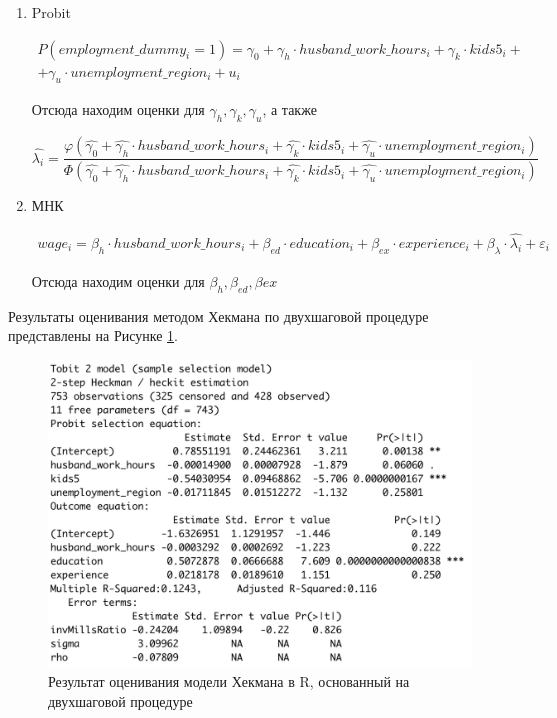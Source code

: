 \documentclass[a4paper,12pt]{article}
\begin{document}
\begin{enumerate}
	\item Probit 
	
	\begin{equation*}
		\begin{aligned}
			P(employment\_dummy_i=1) =\gamma_0+ \gamma_h \cdot husband\_work\_hours_i + \gamma_k \cdot kids5_i +  \\ + \gamma_u \cdot unemployment\_region_i + u_i
		\end{aligned}
	\end{equation*}

Отсюда находим оценки для $\gamma_h, \gamma_k, \gamma_u$, а также

$\hat{\lambda_i }= \dfrac{\varphi(\hat{\gamma_0}+ \hat{\gamma_h} \cdot husband\_work\_hours_i  + \hat{\gamma_k} \cdot kids5_i +  \hat{\gamma_u} \cdot unemployment\_region_i   )}{\Phi (\hat{\gamma_0}+  \hat{\gamma_h} \cdot husband\_work\_hours_i  + \hat{\gamma_k} \cdot kids5_i +  \hat{\gamma_u} \cdot unemployment\_region_i  )}$

\item МНК

\begin{equation*}
	\begin{aligned}
		wage_i = \beta_h \cdot husband\_work\_hours_i  +\beta_{ed} \cdot education_i + \beta_{ex} \cdot experience_i + \beta_{\lambda}\cdot\hat{\lambda_i }+  \varepsilon_i
	\end{aligned}
\end{equation*}

Отсюда находим оценки для $\beta_h, \beta_{ed}, \beta{ex}$
\end{enumerate}

Результаты оценивания методом Хекмана по двухшаговой процедуре представлены на Рисунке \ref{hekman2}.

\begin{figure}[!h] \centering
	\caption{Результат оценивания модели Хекмана в R, основанный на двухшаговой процедуре}
	\label{hekman2}
	\includegraphics[scale=0.58]{heckman2step.png}
\end{figure}
\end{document}
